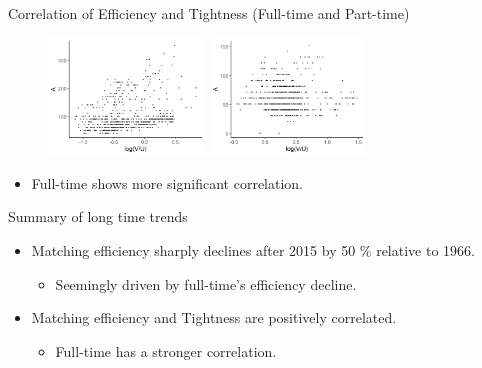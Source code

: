 \documentclass[aspectratio=169]{beamer}
\begin{document}
\begin{frame}{Correlation of Efficiency and Tightness (Full-time and Part-time)}
    
\begin{figure}[!ht]
  \begin{center}
  \includegraphics[width = 0.37\textwidth]
  {figuretable/efficiency_tightness_plot_month_full_time.png}
  \includegraphics[width = 0.37\textwidth]
  {figuretable/efficiency_tightness_plot_month_part_time.png}
  \end{center}
  \footnotesize
\end{figure} 
\begin{itemize}
    \item Full-time shows more significant correlation.
\end{itemize}
\end{frame}

\begin{frame}{Summary of long time trends}
    \begin{itemize}
        \item Matching efficiency sharply declines after 2015 by 50 \% relative to 1966.
        \begin{itemize}
            \item Seemingly driven by full-time's efficiency decline.
        \end{itemize}
        
        \item Matching efficiency and Tightness are positively correlated.
        \begin{itemize}
            \item Full-time has a stronger correlation.
        \end{itemize}
        
    \end{itemize}
\end{frame}
\end{document}
